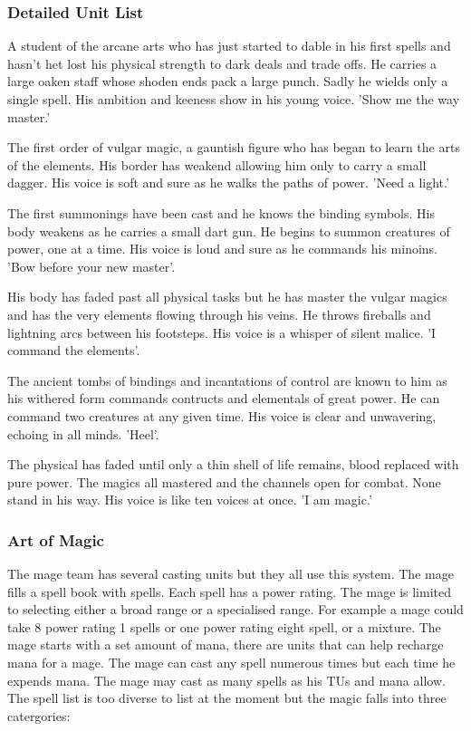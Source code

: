 \documentclass[a4paper]{article}
\begin{document}
\subsubsection{Detailed Unit List}

A student of the arcane arts who has just started to dable in his first spells and hasn't het lost his physical strength to dark deals and trade offs. He carries a large oaken staff whose shoden ends pack a large punch. Sadly he wields only a single spell. His ambition and keeness show in his young voice. 'Show me the way master.'

The first order of vulgar magic, a gauntish figure who has began to learn the arts of the elements. His border has weakend allowing him only to carry a small dagger. His voice is soft and sure as he walks the paths of power. 'Need a light.'

The first summonings have been cast and he knows the binding symbols. His body weakens as he carries a small dart gun. He begins to summon creatures of power, one at a time. His voice is loud and sure as he commands his minoins. 'Bow before your new master'.

His body has faded past all physical tasks but he has master the vulgar magics and has the very elements flowing through his veins. He throws fireballs and lightning arcs between his footsteps. His voice is a whisper of silent malice. 'I command the elements'.

The ancient tombs of bindings and incantations of control are known to him as his withered form commands contructs and elementals of great power. He can command two creatures at any given time. His voice is clear and unwavering, echoing in all minds. 'Heel'.

The physical has faded until only a thin shell of life remains, blood replaced with pure power. The magics all mastered and the channels open for combat. None stand in his way. His voice is like ten voices at once. 'I am magic.'

\subsubsection{Art of Magic}
The mage team has several casting units but they all use this system. The mage fills a spell book with spells. Each spell has a power rating. The mage is limited to selecting either a broad range or a specialised range. For example a mage could take 8 power rating 1 spells or one power rating eight spell, or a mixture.
The mage starts with a set amount of mana, there are units that can help recharge mana for a mage. The mage can cast any spell numerous times but each time he expends mana. The mage may cast as many spells as his TUs and mana allow.
The spell list is too diverse to list at the moment but the magic falls into three catergories:
\end{document}
